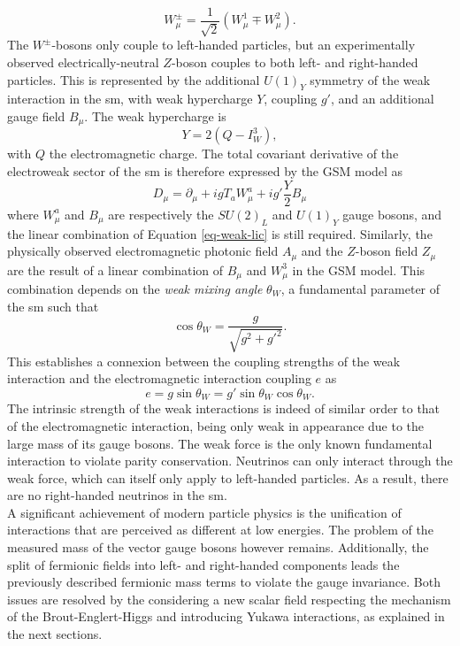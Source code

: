 \begin{equation}\label{eq-weak-lic}
    W_{\mu}^{\pm} = \frac{1}{\sqrt{2}} \left(W_{\mu}^{1} \mp W_{\mu}^{2} \right).
\end{equation}
The $W^{\pm}$-bosons only couple to left-handed particles, but an experimentally observed electrically-neutral $Z$-boson couples to both left- and right-handed particles. This is represented by the additional $U(1)_Y$ symmetry of the weak interaction in the \gls{sm}, with weak hypercharge $Y$, coupling $g'$, and an additional gauge field $B_{\mu}$. The weak hypercharge is \[Y = 2 (Q - I_W^3),\] with $Q$ the electromagnetic charge. The total covariant derivative of the electroweak sector of the \gls{sm} is therefore expressed by the GSM model as 
\begin{equation}\label{eq-GaugeEW}
    D_{\mu}  = \partial_{\mu} + ig T_a W_{\mu}^a + ig' \frac{Y}{2} B_{\mu} %
\end{equation}
where $W_{\mu}^a$ and $B_{\mu}$ are respectively the $SU(2)_L$ and $U(1)_Y$ gauge bosons, and the linear combination of Equation \ref{eq-weak-lic} is still required. Similarly, the physically observed electromagnetic photonic field $A_\mu$ and the $Z$-boson field $Z_{\mu}$ are the result of a linear combination of $B_{\mu}$ and $W_{\mu}^3$ in the GSM model. This combination depends on the \textit{weak mixing angle} $\theta_W$, a fundamental parameter of the \gls{sm} such that
\begin{equation}\label{eq-weakmixangle}
    \cos\theta_W = \frac{g}{\sqrt{g^2 +g'^2}}.
\end{equation}
This establishes a connexion between the coupling strengths of the weak interaction and the electromagnetic interaction coupling $e$ as \[e = g \sin \theta_W = g' \sin\theta_W \cos\theta_W.\] The intrinsic strength of the weak interactions is indeed of similar order to that of the electromagnetic interaction, being only weak in appearance due to the large mass of its gauge bosons. The weak force is the only known fundamental interaction to violate parity conservation. Neutrinos can only interact through the weak force, which can itself only apply to left-handed particles. As a result, there are no right-handed neutrinos in the \gls{sm}. \\

A significant achievement of modern particle physics is the unification of interactions that are perceived as different at low energies. The problem of the measured mass of the vector gauge bosons however remains. Additionally, the split of fermionic fields into left- and right-handed components leads the previously described fermionic mass terms to violate the gauge invariance. Both issues are resolved by the considering a new scalar field respecting the mechanism of the Brout-Englert-Higgs and introducing Yukawa interactions, as explained in the next sections.

